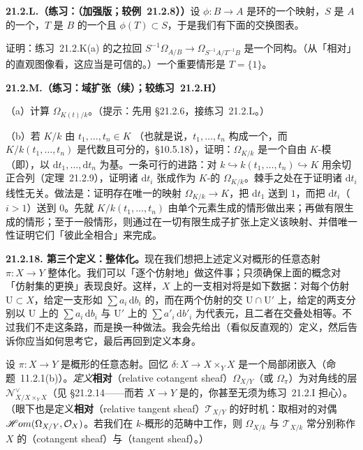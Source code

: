 \textbf{21.2.L.（练习：\trLocalization{}（加强版；较\mbox{例~21.2.8}））}\quad 设 $\phi\colon B\to A$ 是环的一个映射，$S$ 是 $A$ 的一个\trMultiplicativeSubset，$T$ 是 $B$ 的一个\trMultiplicativeSubset{}且 $\phi(T)\subset S$，于是我们有下面的交换图表。
证明：\mbox{练习~21.2.K(a)} 的\trDifferential{}之拉回 $S^{-1}\Omega_{A/B}\to\Omega_{S^{-1}A/T^{-1}B}$ 是一个同构。（从「相对\trTangentVector」的直观图像看，这应当是可信的。）一个重要情形是 $T=\{1\}$。

\textbf{21.2.M.（练习：域扩张（续）；较\mbox{练习~21.2.H}）}

（a）计算 $\Omega_{K(t)/k}$。（提示：先用 \S21.2.6，接\mbox{练习~21.2.L}。）

（b）若 $K/k$ 由 $t_1,\dots,t_n\in K$ \emph{\trSeparablyGenerated}（也就是说，$t_1,\dots,t_n$ 构成一个\trTranscendenceBase，而 $K/k(t_1,\dots,t_n)$ 是代数且可分的，\S10.5.18），证明：$\Omega_{K/k}$ 是一个自由 $K$-模（即\trVectorSpace），以 $\mathrm{d}t_1,\dots,\mathrm{d}t_n$ 为基。一条可行的进路：对 $k\hookrightarrow k(t_1,\dots,t_n)\hookrightarrow K$ 用余切正合列（\mbox{定理~21.2.9}），证明诸 $\mathrm{d}t_i$ 张成作为 $K$-\trVectorSpace{}的 $\Omega_{K/k}$。棘手之处在于证明诸 $\mathrm{d}t_i$ 线性无关。做法是：证明存在唯一的映射 $\Omega_{K/k}\to K$，把 $\mathrm{d}t_1$ 送到 $1$，而把 $\mathrm{d}t_i$（$i>1$）送到 $0$。先就 $K/k(t_1,\dots,t_n)$ 由单个元素生成的情形做出来；再做有限生成的情形；至于一般情形，则通过在一切有限生成子扩张上定义该映射、并借唯一性证明它们「彼此全相合」来完成。

\textbf{21.2.18. 第三个定义：整体化。}\quad 现在我们想把上述定义对概形的任意态射 $\pi\colon X\to Y$ 整体化。我们可以「逐个仿射地」做这件事；只须确保上面的概念对「仿射集的更换」表现良好。这样，$X$ 上的一支相对\trDifferential{}将是如下数据：对每个仿射 $\mathrm{U}\subset X$，给定一支形如 $\sum a_i\,\mathrm{d}b_i$ 的\trDifferential，而在两个仿射\trOpenSet{}的交 $\mathrm{U}\cap\mathrm{U}'$ 上，给定的两支\trDifferential{}分别以 $\mathrm{U}$ 上的 $\sum a_i\,\mathrm{d}b_i$ 与 $\mathrm{U}'$ 上的 $\sum a'_i\,\mathrm{d}b'_i$ 为代表元，且二者在交叠处相等。不过我们不走这条路，而是换一种做法。我会先给出（看似反直观的）定义，然后告诉你应当如何思考它，最后再回到定义本身。

设 $\pi\colon X\to Y$ 是概形的任意态射。回忆 $\delta\colon X\to X\times_YX$ 是一个局部闭嵌入（\mbox{命题~11.2.1(b)}）。\emph{定义}\textbf{相对\trCotangentSheaf}（relative cotangent sheaf）$\Omega_{X/Y}$（或 $\Omega_\pi$）为对角线的\trConormal{}层 $\mathscr{N}^{\vee}_{X/X\times_YX}$（见 \S21.2.14——而若 $X\to Y$ 是\trSeparated{}的，你甚至无须为\mbox{练习~21.2.I} 担心）。（眼下也是定义\textbf{相对\trTangentSheaf}（relative tangent sheaf）$\mathscr{T}_{X/Y}$ 的好时机：取相对\trCotangentSheaf{}的对偶 $\mathscr{H}om(\Omega_{X/Y},\mathcal{O}_X)$。若我们在 $k$-概形的范畴中工作，则 $\Omega_{X/k}$ 与 $\mathscr{T}_{X/k}$ 常分别称作 $X$ 的\textbf{\trCotangentSheaf}（cotangent sheaf）与\textbf{\trTangentSheaf}（tangent sheaf）。）

